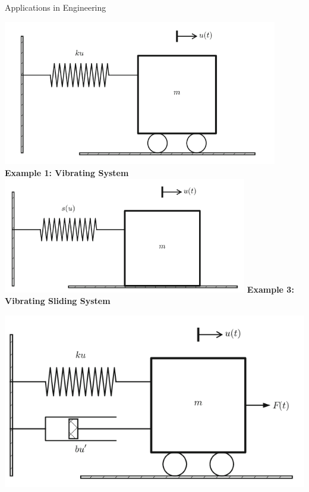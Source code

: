 \documentclass[10pt, aspectratio=54]{beamer}
\begin{document}
\begin{frame}{Applications in Engineering}
	\justifying
	\begin{minipage}[t]{0.48\textwidth}
		\centering
		\includegraphics[width=0.9\textwidth]{Figures/Vibrating_system_scheme.png} %
		\vspace{0.2cm}
		\textbf{Example 1: Vibrating System}
		\vspace{0.3cm}
		\includegraphics[width=0.8\textwidth]{Figures/Vibrating_sliding_system_scheme.png} %
		\vspace{0.2cm}
		\textbf{Example 3: Vibrating Sliding System}
	\end{minipage}
	\hfill
	\begin{minipage}[t]{0.48\textwidth}
		\centering
		\includegraphics[width=1.0\textwidth]{Figures/Vibrating_dumped_system_scheme.png} %

\end{minipage}
\end{frame}
\end{document}

